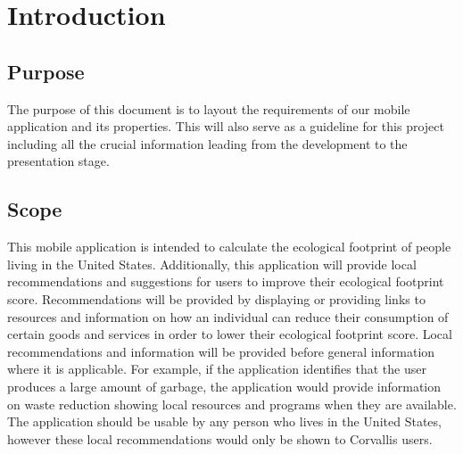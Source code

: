\documentclass[onecolumn, draftclsnofoot,10pt, compsoc, tikz]{IEEEtran}
\begin{document}
\section{Introduction}

\subsection{Purpose}
The purpose of this document is to layout the requirements of our mobile application and its properties. This will also serve as a guideline for this project including all the crucial information leading from the development to the presentation stage. 

\subsection{Scope}
This mobile application is intended to calculate the ecological footprint of people living in the United States. Additionally, this application will provide local recommendations and suggestions for users to improve their ecological footprint score.
Recommendations will be provided by displaying or providing links to resources and information on how an individual can reduce their consumption of certain goods and services in order to lower their ecological footprint score. 
Local recommendations and information will be provided before general information where it is applicable. 
For example, if the application identifies that the user produces a large amount of garbage, the application would provide information on waste reduction showing local resources and programs when they are available.
The application should be usable by any person who lives in the United States, however these local recommendations would only be shown to Corvallis users.
\end{document}
